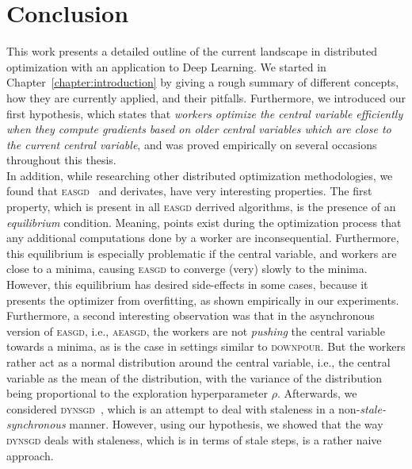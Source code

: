 %
%
%

\chapter{Conclusion}
\label{chapter:conclusion}

This work presents a detailed outline of the current landscape in distributed optimization with an application to Deep Learning. We started in Chapter~\ref{chapter:introduction} by giving a rough summary of different concepts, how they are currently applied, and their pitfalls. Furthermore, we introduced our first hypothesis, which states that \emph{workers optimize the central variable efficiently when they compute gradients based on older central variables which are close to the current central variable}, and was proved empirically on several occasions throughout this thesis.\\

In addition, while researching other distributed optimization methodologies, we found that \textsc{easgd}~\cite{zhang2015deep} and derivates, have very interesting properties. The first property, which is present in all \textsc{easgd} derrived algorithms, is the presence of an \emph{equilibrium} condition. Meaning, points exist during the optimization process that any additional computations done by a worker are inconsequential. Furthermore, this equilibrium is especially problematic if the central variable, and workers are close to a minima, causing \textsc{easgd} to converge (very) slowly to the minima. However, this equilibrium has desired side-effects in some cases, because it presents the optimizer from overfitting, as shown empirically in our experiments. Furthermore, a second interesting observation was that in the asynchronous version of \textsc{easgd}, i.e., \textsc{aeasgd}, the workers are not \emph{pushing} the central variable towards a minima, as is the case in settings similar to \textsc{downpour}. But the workers rather act as a normal distribution around the central variable, i.e., the central variable as the mean of the distribution, with the variance of the distribution being proportional to the exploration hyperparameter $\rho$. Afterwards, we considered \textsc{dynsgd}~\cite{jiang2017heterogeneity}, which is an attempt to deal with staleness in a non-\emph{stale-synchronous} manner. However, using our hypothesis, we showed that the way \textsc{dynsgd} deals with staleness, which is in terms of stale steps, is a rather naive approach.\\

